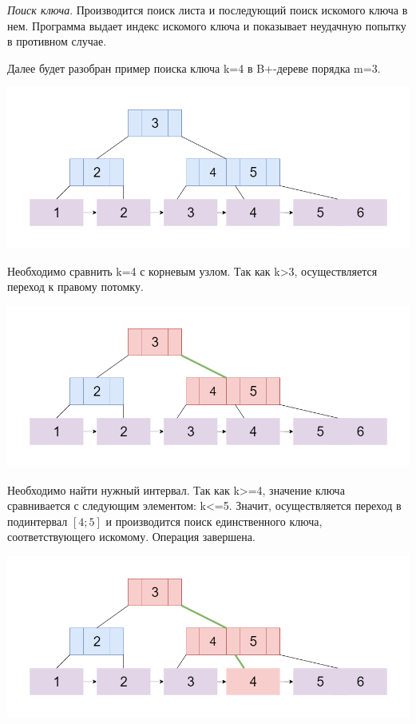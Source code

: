 \documentclass{article}
\begin{document}
\textit{Поиск ключа}. Производится поиск листа и последующий поиск искомого ключа в нем. Программа выдает индекс искомого ключа и показывает неудачную попытку в противном случае.

Далее будет разобран пример поиска ключа k=4 в B+-дереве порядка m=3.

\includegraphics[scale=0.4]{bsearch.png}

Необходимо сравнить k=4 с корневым узлом. Так как k>3, осуществляется переход к правому потомку.

\includegraphics[scale=0.4]{bsearch2.png}

Необходимо найти нужный интервал. Так как k>=4, значение ключа сравнивается с следующим элементом: k<=5. Значит, осуществляется переход в подинтервал $[4; 5]$ и производится поиск единственного ключа, соответствующего искомому. Операция завершена.

\includegraphics[scale=0.4]{bsearch3.png}
\end{document}
